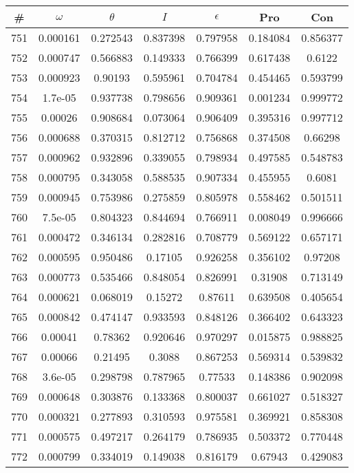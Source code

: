 \newpage
\begin{table}
\begin{tabular}{c|c|c|c|c|c|c}
\# & $\omega$ & $\theta$ & $I$ & $\epsilon$ & Pro & Con\\
\hline
751 & 0.000161 & 0.272543 & 0.837398 & 0.797958 & 0.184084 & 0.856377\\
752 & 0.000747 & 0.566883 & 0.149333 & 0.766399 & 0.617438 & 0.6122\\
753 & 0.000923 & 0.90193 & 0.595961 & 0.704784 & 0.454465 & 0.593799\\
754 & 1.7e-05 & 0.937738 & 0.798656 & 0.909361 & 0.001234 & 0.999772\\
755 & 0.00026 & 0.908684 & 0.073064 & 0.906409 & 0.395316 & 0.997712\\
756 & 0.000688 & 0.370315 & 0.812712 & 0.756868 & 0.374508 & 0.66298\\
757 & 0.000962 & 0.932896 & 0.339055 & 0.798934 & 0.497585 & 0.548783\\
758 & 0.000795 & 0.343058 & 0.588535 & 0.907334 & 0.455955 & 0.6081\\
759 & 0.000945 & 0.753986 & 0.275859 & 0.805978 & 0.558462 & 0.501511\\
760 & 7.5e-05 & 0.804323 & 0.844694 & 0.766911 & 0.008049 & 0.996666\\
761 & 0.000472 & 0.346134 & 0.282816 & 0.708779 & 0.569122 & 0.657171\\
762 & 0.000595 & 0.950486 & 0.17105 & 0.926258 & 0.356102 & 0.97208\\
763 & 0.000773 & 0.535466 & 0.848054 & 0.826991 & 0.31908 & 0.713149\\
764 & 0.000621 & 0.068019 & 0.15272 & 0.87611 & 0.639508 & 0.405654\\
765 & 0.000842 & 0.474147 & 0.933593 & 0.848126 & 0.366402 & 0.643323\\
766 & 0.00041 & 0.78362 & 0.920646 & 0.970297 & 0.015875 & 0.988825\\
767 & 0.00066 & 0.21495 & 0.3088 & 0.867253 & 0.569314 & 0.539832\\
768 & 3.6e-05 & 0.298798 & 0.787965 & 0.77533 & 0.148386 & 0.902098\\
769 & 0.000648 & 0.303876 & 0.133368 & 0.800037 & 0.661027 & 0.518327\\
770 & 0.000321 & 0.277893 & 0.310593 & 0.975581 & 0.369921 & 0.858308\\
771 & 0.000575 & 0.497217 & 0.264179 & 0.786935 & 0.503372 & 0.770448\\
772 & 0.000799 & 0.334019 & 0.149038 & 0.816179 & 0.67943 & 0.429083\\

\end{tabular}
\end{table}
